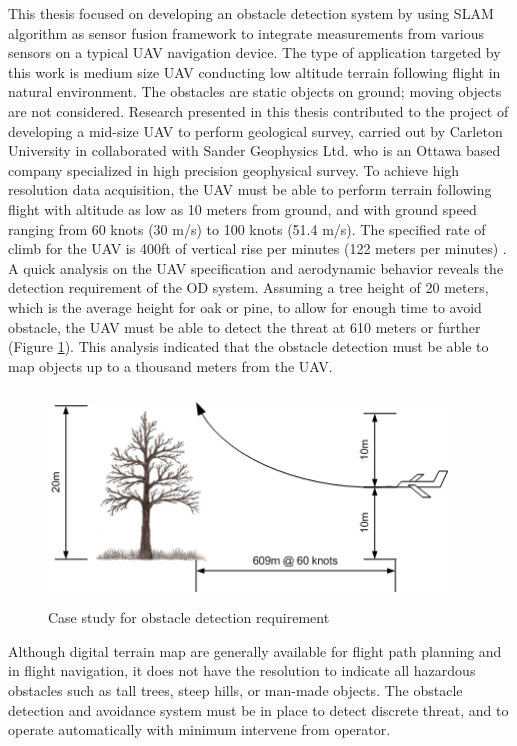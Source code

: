 This thesis focused on developing an obstacle detection system by
using SLAM algorithm as sensor fusion framework to integrate
measurements from various sensors on a typical UAV navigation device.
The type of application targeted by this work is medium size UAV
conducting low altitude terrain following flight in natural
environment. The obstacles are static objects on ground; moving
objects are not considered. Research presented in this thesis
contributed to the project of developing a mid-size UAV to perform
geological survey, carried out by Carleton University in collaborated
with Sander Geophysics Ltd. who is an Ottawa based company specialized in
high precision geophysical survey. To achieve high resolution data
acquisition, the UAV must be able to perform terrain following flight
with altitude as low as 10 meters from ground, and with ground speed
ranging from 60 knots (30 m/s) to 100 knots (51.4 m/s). The specified
rate of climb for the UAV is 400ft of vertical rise per minutes (122
meters per minutes) \cite{james_geosurv_2008}. A quick analysis on the
UAV specification and aerodynamic behavior reveals the detection
requirement of the OD system. Assuming a tree height of 20 meters,
which is the average height for oak or pine, to allow for enough time
to avoid obstacle, the UAV must be able to detect the threat at 610
meters or further (Figure \ref{ob}). This analysis
indicated that the obstacle detection must be able to map objects up to
a thousand meters from the UAV.

\begin{figure}[h]
\centering
\includegraphics[width=300pt,height=160pt]{./Figures/ProblemStatement.png}
\caption {Case study for obstacle detection requirement}
\label{ob}
\end{figure}

Although digital terrain map are generally available for flight path
planning and in flight navigation, it does not have the resolution to
indicate all hazardous obstacles such as tall trees, steep hills, or
man-made objects. The obstacle detection and avoidance system must be
in place to detect discrete threat, and to operate automatically with
minimum intervene from operator.


